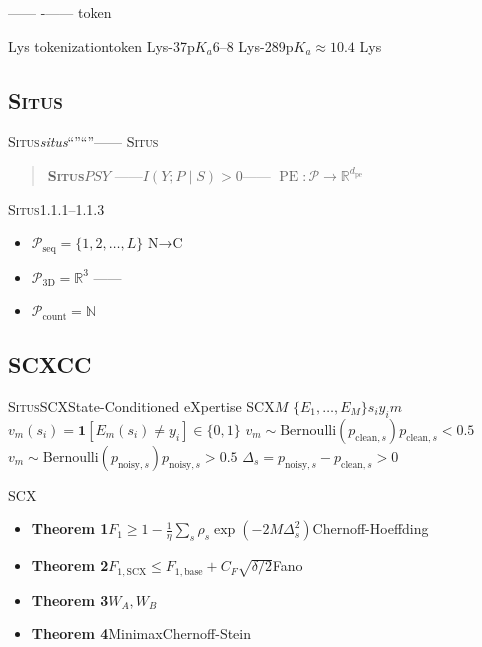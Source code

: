 \documentclass[11pt,a4paper]{article}
\theoremstyle{remark}
\DeclareMathOperator{\PE}{PE}
\newcommand{\R}{\mathbb{R}}
\newcommand{\N}{\mathbb{N}}
\newcommand{\Ppos}{\mathcal{P}}
\newcommand{\Situs}{\textsc{Situs}}
\newcommand{\pe}{\mathrm{pe}}
\begin{document}
\textbf{}——
-——
\textbf{}token


\textbf{}Lys
tokenizationtoken
Lys-37$\text{p}K_a$6--8
Lys-289$\text{p}K_a \approx 10.4$
\textbf{}
Lys\textbf{}


\subsection{\Situs{}}

\Situs{}\textit{situs}``''``''——
\textbf{}\Situs{}

\begin{quote}
    \textbf{\Situs{}}$P$$S$$Y$
    ——$I(Y; P \mid S) > 0$——
    $\PE: \Ppos \to \R^{d_{\pe}}$
    
\end{quote}

\Situs{}1.1.1--1.1.3
\begin{itemize}
    \item \textbf{} $\Ppos_{\text{seq}} = \{1, 2, \ldots, L\}$
          N→C
    \item \textbf{} $\Ppos_{\text{3D}} = \R^3$
          ——
          \textbf{}
    \item \textbf{} $\Ppos_{\text{count}} = \N$
          
\end{itemize}

\subsection{SCXCC}

\Situs{}SCXState-Conditioned eXpertise
SCX\cite{scx2026theorems}$M$
$\{E_1, \ldots, E_M\}$$s_i$$y_i$$m$
$v_m(s_i) = \mathbf{1}[E_m(s_i) \neq y_i] \in \{0, 1\}$
$v_m \sim \text{Bernoulli}(p_{\text{clean}, s})$$p_{\text{clean}, s} < 0.5$
$v_m \sim \text{Bernoulli}(p_{\text{noisy}, s})$$p_{\text{noisy}, s} > 0.5$
$\Delta_s = p_{\text{noisy}, s} - p_{\text{clean}, s} > 0$

SCX\cite{scx2026cc_audit}
\begin{itemize}
    \item \textbf{Theorem 1}$F_1 \geq 1 - \frac{1}{\eta}\sum_s \rho_s \exp(-2M\Delta_s^2)$Chernoff-Hoeffding
    \item \textbf{Theorem 2}$F_{1,\text{SCX}} \leq F_{1,\text{base}} + C_F\sqrt{\delta/2}$Fano
    \item \textbf{Theorem 3}$W_A, W_B$
    \item \textbf{Theorem 4}MinimaxChernoff-Stein
\end{itemize}
\end{document}
